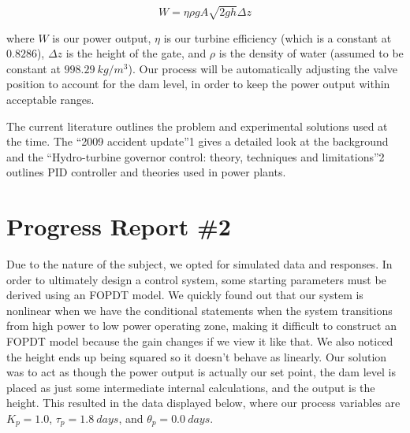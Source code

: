 \documentclass{article}
\begin{document}
\begin{multicols*}{2}
        \begin{equation}
            W=\eta \rho gA\sqrt{2gh}\Delta z
        \end{equation}

        where $W$ is our power output, $\eta$ is our turbine efficiency (which is a constant at $0.8286$), $\Delta z$ is the height of the gate, and $\rho$ is the density of water (assumed to be constant at $998.29\ kg/m^3$). Our process will be automatically adjusting the valve position to account for the dam level, in order to keep the power output within acceptable ranges.

        The current literature outlines the problem and experimental solutions used at the time. The “2009 accident update”1  gives a detailed look at the background and the “Hydro-turbine governor control: theory, techniques and limitations”2 outlines PID controller and theories used in power plants.

        \section{Progress Report \#2}

        Due to the nature of the subject, we opted for simulated data and responses.  In order to ultimately design a control system, some starting parameters must be derived using an FOPDT model.  We quickly found out that our system is nonlinear when we have the conditional statements when the system transitions from high power to low power operating zone, making it difficult to construct an FOPDT model because the gain changes if we view it like that.  We also noticed the height ends up being squared so it doesn’t behave as linearly.  Our solution was to act as though the power output is actually our set point, the dam level is placed as just some intermediate internal calculations, and the output is the height. This resulted in the data displayed below, where our process variables are $K_p = 1.0$, $\tau_p = 1.8\ days$, and $\theta_p = 0.0\ days$.


\end{multicols*}
\end{document}
